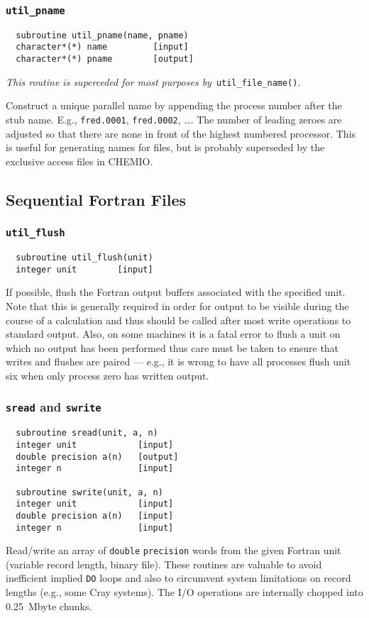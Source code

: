 \subsubsection{{\tt util\_pname}}
\begin{verbatim}
  subroutine util_pname(name, pname)
  character*(*) name         [input]
  character*(*) pname        [output]
\end{verbatim}
{\em This routine is superceded for most purposes by}\ 
\verb+util_file_name()+.  

Construct a unique parallel name by appending the process number after
the stub name. E.g., \verb+fred.0001+, \verb+fred.0002+, \ldots. The
number of leading zeroes are adjusted so that there are none in front
of the highest numbered processor.  This is useful for generating
names for files, but is probably superseded by the exclusive access
files in CHEMIO.

\subsection{Sequential Fortran Files}

\subsubsection{{\tt util\_flush}}
\begin{verbatim}
  subroutine util_flush(unit)
  integer unit        [input]
\end{verbatim}
If possible, flush the Fortran output buffers associated with the
specified unit.  Note that this is generally required in order for
output to be visible during the course of a calculation and thus
should be called after most write operations to standard output.
Also, on some machines it is a fatal error to flush a unit on which no
output has been performed thus care must be taken to ensure that
writes and flushes are paired --- e.g., it is wrong to have all
processes flush unit six when only process zero has written output.

\subsubsection{{\tt sread} and {\tt swrite}}
\begin{verbatim}
  subroutine sread(unit, a, n)
  integer unit            [input]
  double precision a(n)   [output]
  integer n               [input]

  subroutine swrite(unit, a, n)
  integer unit            [input]
  double precision a(n)   [input]
  integer n               [input]
\end{verbatim}
Read/write an array of {\tt double} {\tt precision} words from the given Fortran
unit (variable record length, binary file).  These routines are
valuable to avoid inefficient implied {\tt DO} loops and also to
circumvent system limitations on record lengths (e.g., some Cray
systems).  The I/O operations are internally chopped into 0.25~Mbyte
chunks.


